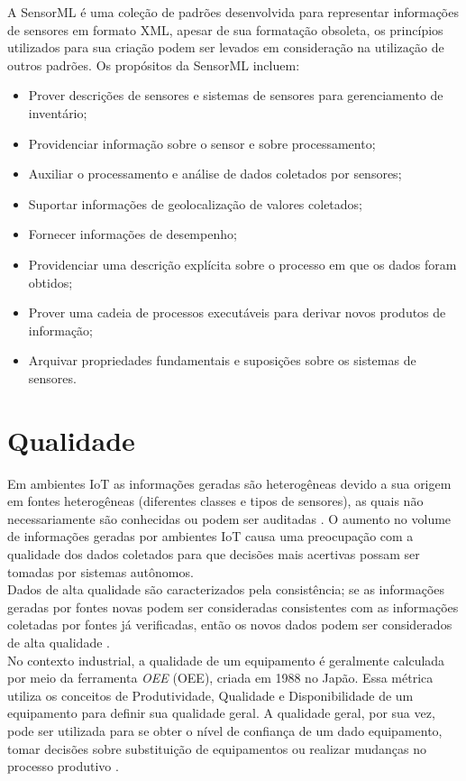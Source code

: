      \quad A \acrfull{SensorML} \cite{SML} é uma coleção de padrões
    desenvolvida para representar informações de sensores em formato XML, apesar de sua formatação obsoleta, os princípios utilizados para sua criação podem ser levados em consideração na utilização de outros padrões. Os propósitos da \acrshort{SensorML} incluem:
    \begin{itemize}
      \item Prover descrições de sensores e sistemas de sensores para gerenciamento de inventário;
      \item Providenciar informação sobre o sensor e sobre processamento;
      \item Auxiliar o processamento e análise de dados coletados por sensores;
      \item Suportar informações de geolocalização de valores coletados;
      \item Fornecer informações de desempenho;
      \item Providenciar uma descrição explícita sobre o processo em que os dados foram obtidos;
      \item Prover uma cadeia de processos executáveis para derivar novos produtos de informação;
      \item Arquivar propriedades fundamentais e suposições sobre os sistemas de sensores.
    \end{itemize}
\section{Qualidade}
\label{sec:qualidade}
\quad Em ambientes \acrshort{IoT} as informações geradas são heterogêneas devido a sua origem em fontes heterogêneas (diferentes classes e tipos de sensores), as quais não necessariamente são conhecidas ou podem ser auditadas \cite{dataquality}. O aumento no volume de informações geradas por ambientes \acrshort{IoT} causa uma preocupação com a qualidade dos dados coletados para que decisões mais acertivas possam ser tomadas por sistemas autônomos.
\\\null\quad Dados de alta qualidade são caracterizados pela consistência; se as informações geradas por fontes novas podem ser consideradas consistentes com as informações coletadas por fontes já verificadas, então os novos dados podem ser considerados de alta qualidade \cite{dataquality}.
\\\null\quad No contexto industrial, a qualidade de um equipamento é geralmente calculada por meio da ferramenta \textit{\acrlong{OEE}} (\acrshort{OEE}), criada em 1988 no Japão. Essa métrica utiliza os conceitos de Produtividade, Qualidade e Disponibilidade de um equipamento para definir sua qualidade geral. A qualidade geral, por sua vez, pode ser utilizada para se obter o nível de confiança de um dado equipamento, tomar decisões sobre substituição de equipamentos ou realizar mudanças no processo produtivo \cite{artigoOEE}.


